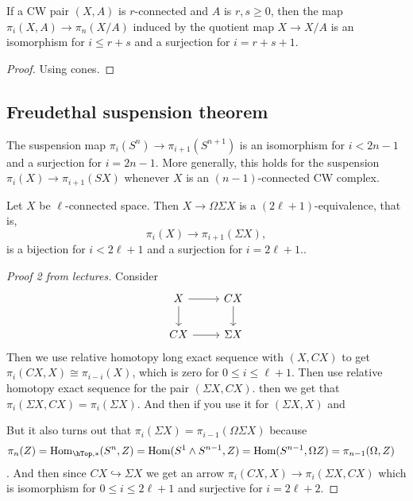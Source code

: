 \begin{remark}
\begin{prop}
	If a CW pair $(X,A)$ is $r$-connected and $A$ is $r,s \geq 0$, then the map $\pi_{i}(X,A)\to \pi_{n}(X/A)$ induced by the quotient map $X\to X/A$ is an isomorphism for $i\leq r+s$ and a surjection for $i=r+s+1$.
\end{prop}
\begin{proof}
	Using cones.
\end{proof}

\subsection{Freudethal suspension theorem}

\begin{coro}
	The suspension map $\pi_{i}(S^{n})\to \pi_{i+1}(S^{n+1})$ is an isomorphism for $i<2n-1$ and a surjection for $i=2n-1$. More generally, this holds for the suspension $\pi_{i}(X)\to \pi_{i+1}(SX)$ whenever $X$ is an $(n-1)$-connected CW complex.
\end{coro}
\begin{thm}
		Let $X$ be $\ell$-connected space. Then $X\to\Omega\Sigma X$ is a $(2\ell+1)$-equivalence, that is,
	\[\pi_i(X)\to \pi_{i+1}(\Sigma X),\]
	is a bijection for $i<2\ell+1$ and a surjection for $i=2\ell+1$..
\end{thm}
\begin{proof}[Proof 2 from lectures]
	Consider
	\[\begin{tikzcd}
		X\arrow[r]\arrow[d]&CX\arrow[d]\\
		CX\arrow[r]&\Sigma X
	\end{tikzcd}\]
	Then we use relative homotopy long exact sequence with $(X,CX)$ to get $\pi_i(CX,X)\cong\pi_{i-i}(X)$, which is zero for $0\leq i\leq \ell+1$. Then use relative homotopy exact sequence for the pair $(\Sigma X,CX)$. then we get that $\pi_i(\Sigma X,CX)=\pi_i(\Sigma X)$. And then if you use it for $(\Sigma X, X)$ and 
	
	But it also turns out that $\pi_i(\Sigma X)=\pi_{i-1}(\Omega\Sigma X)$ because
	\begin{align*}
		\pi_n(Z)&=\text{Hom}_{\hTop,*}(S^n,Z)=\text{Hom}(S^1\wedge S^{n-1},Z)=\text{Hom}(S^{n-1},\Omega Z)=\pi_{n-1}(\Omega,Z)
	\end{align*}.
	And then since $CX\hookrightarrow \Sigma X$ we get an arrow $\pi_i(CX,X)\to\pi_i(\Sigma X,CX)$ which is isomorphism for $0\leq i \leq 2\ell +1$ and surjective for $i=2\ell+2$.
	

\end{proof}
\end{remark}

